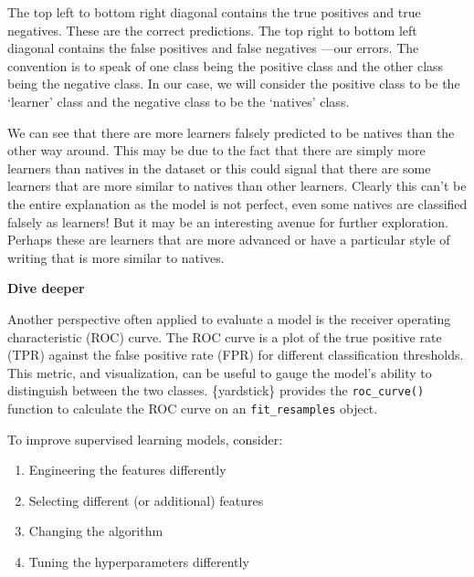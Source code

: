 \documentclass[
  letterpaper,
  krantz1]{latex/krantz-mod}
\providecommand{\tightlist}{%
  \setlength{\itemsep}{0pt}\setlength{\parskip}{0pt}}\usepackage{longtable,booktabs,array}
\theoremstyle{definition}
\theoremstyle{definition}
\theoremstyle{remark}
\begin{document}
The top left to bottom right diagonal contains the true positives and
true negatives. These are the correct predictions. The top right to
bottom left diagonal contains the false positives and false negatives
---our errors. The convention is to speak of one class being the
positive class and the other class being the negative class. In our
case, we will consider the positive class to be the `learner' class and
the negative class to be the `natives' class.

We can see that there are more learners falsely predicted to be natives
than the other way around. This may be due to the fact that there are
simply more learners than natives in the dataset or this could signal
that there are some learners that are more similar to natives than other
learners. Clearly this can't be the entire explanation as the model is
not perfect, even some natives are classified falsely as learners! But
it may be an interesting avenue for further exploration. Perhaps these
are learners that are more advanced or have a particular style of
writing that is more similar to natives.

\begin{tcolorbox}[enhanced jigsaw, toprule=.15mm, breakable, colback=white, arc=.35mm, left=2mm, colframe=quarto-callout-color-frame, opacityback=0, bottomrule=.15mm, rightrule=.15mm, leftrule=.75mm]

\textbf{ Dive deeper}

Another perspective often applied to evaluate a model is the receiver
operating characteristic (ROC)
curve. The ROC
curve is a plot of the true positive rate (TPR) against the false
positive rate (FPR) for different classification thresholds. This
metric, and visualization, can be useful to gauge the model's ability to
distinguish between the two classes. \{yardstick\} provides the
\texttt{roc\_curve()} function to calculate the ROC curve on an
\texttt{fit\_resamples} object.

\end{tcolorbox}

To improve supervised learning models, consider:

\begin{enumerate}
\def\labelenumi{\arabic{enumi}.}
\tightlist
\item
  Engineering the features differently
\item
  Selecting different (or additional) features
\item
  Changing the algorithm
\item
  Tuning the hyperparameters differently
\end{enumerate}
\end{document}
